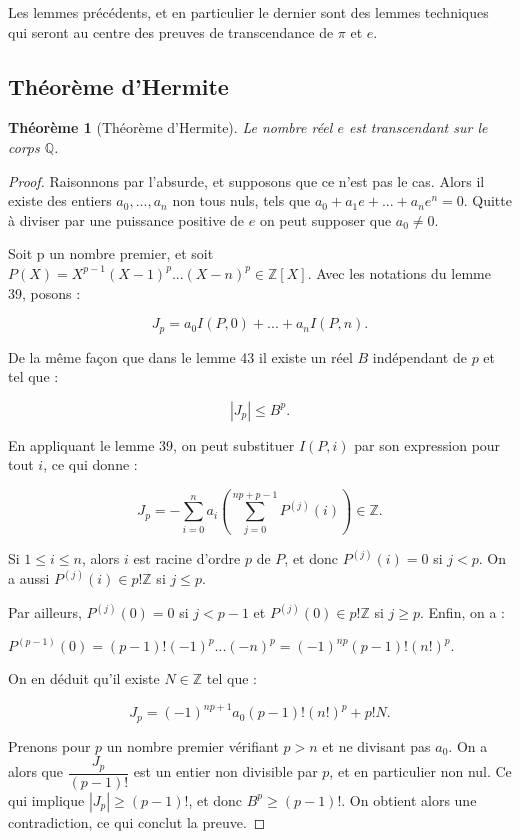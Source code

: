 \documentclass[12pt,a4paper]{report}
\newtheorem{thm}{\bf Th\'eor\`eme}
\begin{document}
Les lemmes précédents, et en particulier le dernier sont des lemmes techniques qui seront au centre des preuves de transcendance de $\pi$ et $e$. 

\subsection{Théorème d'Hermite}

\begin{thm}[Théorème d'Hermite]\rm

Le nombre réel $e$ est transcendant sur le corps $\mathbb{Q}$.

\end{thm}

\begin{proof}
Raisonnons par l'absurde, et supposons que ce n'est pas le cas. Alors il existe des entiers $a_{0},...,a_{n}$ non tous nuls, tels que $a_{0}+a_{1}e+...+a_{n}e^{n}=0$. Quitte à diviser par une puissance positive de $e$ on peut supposer que $a_{0} \neq 0$. 

Soit p un nombre premier, et soit $P(X)=X^{p-1}(X-1)^{p}...(X-n)^{p} \in \mathbb{Z}[X].$ Avec les notations du lemme 39, posons : 

$$J_{p}=a_{0}I(P,0)+...+a_{n}I(P,n).$$

De la même façon que dans le lemme 43 il existe un réel $B$ indépendant de $p$ et tel que :

$$|J_{p}|\leq B^{p}.$$

En appliquant le lemme 39, on peut substituer $I(P,i)$ par son expression pour tout $i$, ce qui donne : 

$$J_{p}=-\sum_{i=0}^{n}a_{i}\left(\sum_{j=0}^{np+p-1}P^{(j)}(i)\right) \in \mathbb{Z}.$$

Si $1\leq i\leq n$, alors $i$ est racine d'ordre $p$ de $P$, et donc $P^{(j)}(i)=0$ si $j<p$. On a aussi $P^{(j)}(i) \in p!\mathbb{Z}$ si $j\leq p.$

Par ailleurs, $P^{(j)}(0)=0$ si $j<p-1$ et $P^{(j)}(0) \in p!\mathbb{Z}$ si $j\geq p$. Enfin, on a :

$P^{(p-1)}(0)=(p-1)!(-1)^{p}...(-n)^{p}=(-1)^{np}(p-1)!(n!)^{p}.$

On en déduit qu'il existe $N \in \mathbb{Z}$ tel que :

$$J_{p}=(-1)^{np+1}a_{0}(p-1)!(n!)^{p}+p!N.$$

Prenons pour $p$ un nombre premier vérifiant $p>n$ et ne divisant pas $a_{0}$. On a alors que $\dfrac{J_{p}}{(p-1)!}$ est un entier non divisible par $p$, et en particulier non nul. Ce qui implique $|J_{p}|\geq (p-1)!$, et donc $ B^{p}\geq (p-1)!.$ On obtient alors une contradiction, ce qui conclut la preuve. 

\end{proof}
\end{document}
